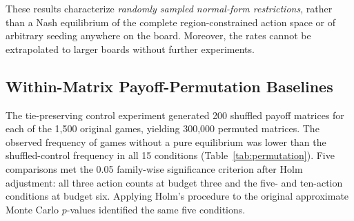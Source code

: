 \documentclass[games,article,submit,moreauthors]{Definitions/mdpi}
\begin{document}
These results characterize \emph{randomly sampled normal-form restrictions}, rather than a Nash equilibrium of the complete region-constrained action space or of arbitrary seeding anywhere on the board. Moreover, the rates cannot be extrapolated to larger boards without further experiments.

\subsection{Within-Matrix Payoff-Permutation Baselines}\label{sec:permutation_results}

The tie-preserving control experiment generated 200 shuffled payoff matrices for each of the 1,500 original games, yielding 300,000 permuted matrices. The observed frequency of games without a pure equilibrium was lower than the shuffled-control frequency in all 15 conditions (Table~\ref{tab:permutation}). Five comparisons met the 0.05 family-wise significance criterion after Holm adjustment: all three action counts at budget three and the five- and ten-action conditions at budget six. Applying Holm's procedure to the original approximate Monte Carlo $p$-values identified the same five conditions.
\end{document}
